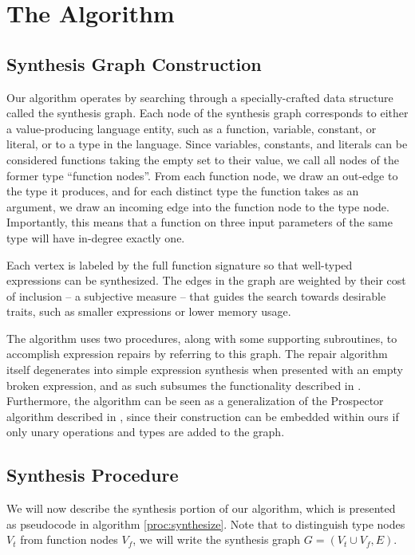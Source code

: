 \section{The Algorithm}
\label{sec:algorithm}
\subsection{Synthesis Graph Construction}
\label{sec:algorithm:graph}

Our algorithm operates by searching through a specially-crafted data structure called the synthesis graph. Each node of the synthesis graph corresponds to either a value-producing language entity, such as a function, variable, constant, or literal, or to a type in the language. Since variables, constants, and literals can be considered functions taking the empty set to their value, we call all nodes of the former type ``function nodes''. From each function node, we draw an out-edge to the type it produces, and for each distinct type the function takes as an argument, we draw an incoming edge into the function node to the type node. Importantly, this means that a function on three input parameters of the same type will have in-degree exactly one.

Each vertex is labeled by the full function signature so that well-typed expressions can be synthesized. The edges in the graph are weighted by their cost of inclusion -- a subjective measure -- that guides the search towards desirable traits, such as smaller expressions or lower memory usage.

The algorithm uses two procedures, along with some supporting subroutines, to accomplish expression repairs by referring to this graph. The repair algorithm itself degenerates into simple expression synthesis when presented with an empty broken expression, and as such subsumes the functionality described in \cite{GveroETAL13CompleteCompletionTypesWeights}. Furthermore, the algorithm can be seen as a generalization of the Prospector algorithm described in \cite{MandelinetALL2005Jungloid}, since their construction can be embedded within ours if only unary operations and types are added to the graph.

\subsection{Synthesis Procedure}
\label{sec:algorithm:synthesis}
We will now describe the synthesis portion of our algorithm, which is presented as pseudocode in algorithm \ref{proc:synthesize}. Note that to distinguish type nodes $V_t$ from function nodes $V_f$, we will write the synthesis graph $G=(V_t \cup V_f, E)$.

